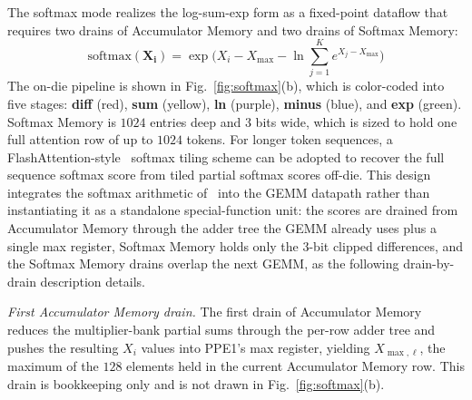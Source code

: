 \documentclass[lettersize,journal]{IEEEtran}
\begin{document}
The softmax mode realizes the log-sum-exp form as a fixed-point dataflow that requires two drains of Accumulator Memory and two drains of Softmax Memory:
\begin{equation}
    \mathrm{softmax}(\mathbf{X_i}) = \exp\!\Big(X_{i} - X_{\max} - \ln\!\sum_{j=1}^{K} e^{X_{j} - X_{\max}}\Big)
    \label{eq:softmax}
\end{equation}
The on-die pipeline is shown in Fig.~\ref{fig:softmax}(b), which is color-coded into five stages: \textbf{diff} (red), \textbf{sum} (yellow), \textbf{ln} (purple), \textbf{minus} (blue), and \textbf{exp} (green). Softmax Memory is $1024$ entries deep and $3$ bits wide, which is sized to hold one full attention row of up to $1024$ tokens. For longer token sequences, a FlashAttention-style~\cite{Dao2022flashattention} softmax tiling scheme can be adopted to recover the full sequence softmax score from tiled partial softmax scores off-die.
This design integrates the softmax arithmetic of~\cite{meiqi2018softmax} into the GEMM datapath rather than instantiating it as a standalone special-function unit: the scores are drained from Accumulator Memory through the adder tree the GEMM already uses plus a single max register, Softmax Memory holds only the 3-bit clipped differences, and the Softmax Memory drains overlap the next GEMM, as the following drain-by-drain description details.

\emph{First Accumulator Memory drain.} The first drain of Accumulator Memory reduces the multiplier-bank partial sums through the per-row adder tree and pushes the resulting $X_i$ values into PPE1's max register, yielding $X_{\max,\ell}$, the maximum of the $128$ elements held in the current Accumulator Memory row. This drain is bookkeeping only and is not drawn in Fig.~\ref{fig:softmax}(b).
\end{document}
